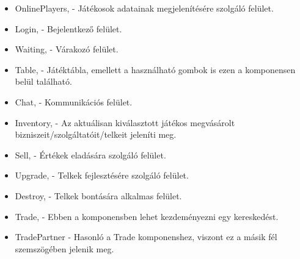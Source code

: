 \begin{itemize}
	\item OnlinePlayers, - Játékosok adatainak megjelenítésére szolgáló felület.
	\item Login, - Bejelentkező felület.
	\item Waiting, - Várakozó felület.
	\item Table, - Játéktábla, emellett a használható gombok is ezen a komponensen belül található.
	\item Chat, - Kommunikációs felület.
	\item Inventory, - Az aktuálisan kiválasztott játékos megvásárolt bizniszeit/szolgáltatóit/telkeit jeleníti meg.
	\item Sell, - Értékek eladására szolgáló felület.
	\item Upgrade, - Telkek fejlesztésére szolgáló felület.
	\item Destroy, - Telkek bontására alkalmas felület.
	\item Trade, - Ebben a komponensben lehet kezdeményezni egy kereskedést.
	\item TradePartner - Hasonló a Trade komponenshez, viszont ez a másik fél szemszögében jelenik meg.
\end{itemize}